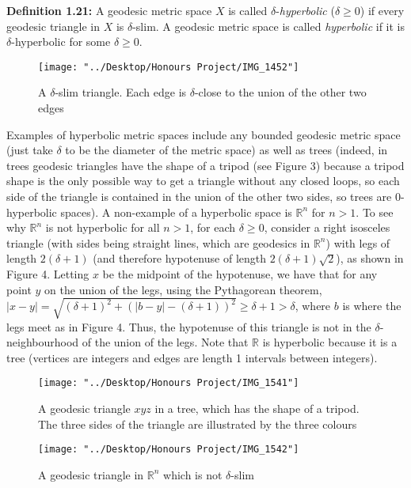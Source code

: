 \documentclass[12pt]{article}
\newcommand{\vs}{\vskip10pt}
\begin{document}
	\vs 
	
	
	\textbf{Definition 1.21: } A geodesic metric space $X$ is called $\delta$-\textit{hyperbolic} ($\delta \geq 0$) if every geodesic triangle in $X$ is $\delta$-slim. A geodesic metric space is called \textit{hyperbolic} if it is $\delta$-hyperbolic for some $\delta \geq 0$.
	
	\begin{figure} [H]
		\centering
		\texttt{[image: "../Desktop/Honours Project/IMG\_1452"]}
		\caption{A $\delta$-slim triangle. Each edge is $\delta$-close to the union of the other two edges}
		\label{fig:img1452}
	\end{figure}
	
	Examples of hyperbolic metric spaces include any bounded geodesic metric space (just take $\delta$ to be the diameter of the metric space) as well as trees (indeed, in trees geodesic triangles have the shape of a tripod (see Figure 3) because a tripod shape is the only possible way to get a triangle without any closed loops, so each side of the triangle is contained in the union of the other two sides, so trees are 0-hyperbolic spaces). A non-example of a hyperbolic space is $\mathbb{R}^n$ for $n > 1$. To see why $\mathbb{R}^n$ is not hyperbolic for all $n > 1$, for each $\delta \geq 0$, consider a right isosceles triangle (with sides being straight lines, which are geodesics in $\mathbb{R}^n$) with legs of length $2(\delta + 1)$ (and therefore hypotenuse of length $2(\delta + 1)\sqrt2$), as shown in Figure 4. Letting $x$ be the midpoint of the hypotenuse, we have that for any point $y$ on the union of the legs, using the Pythagorean theorem, $\vert x - y \vert = \sqrt{(\delta + 1)^2 + (\vert b - y \vert - (\delta + 1))^2} \geq \delta + 1 > \delta$, where $b$ is where the legs meet as in Figure 4. Thus, the hypotenuse of this triangle is not in the $\delta$-neighbourhood of the union of the legs. Note that $\mathbb{R}$ is hyperbolic because it is a tree (vertices are integers and edges are length 1 intervals between integers). 
	
\begin{figure} [H]
	\centering
	\texttt{[image: "../Desktop/Honours Project/IMG\_1541"]}
	\caption{A geodesic triangle $xyz$ in a tree, which has the shape of a tripod. The three sides of the triangle are illustrated by the three colours}
	\label{fig:img1541}
\end{figure}
	
\begin{figure} [H]
	\centering
	\texttt{[image: "../Desktop/Honours Project/IMG\_1542"]}
	\caption{A geodesic triangle in $\mathbb{R}^n$ which is not $\delta$-slim}
	\label{fig:img1542}
\end{figure}
	
\end{document}

